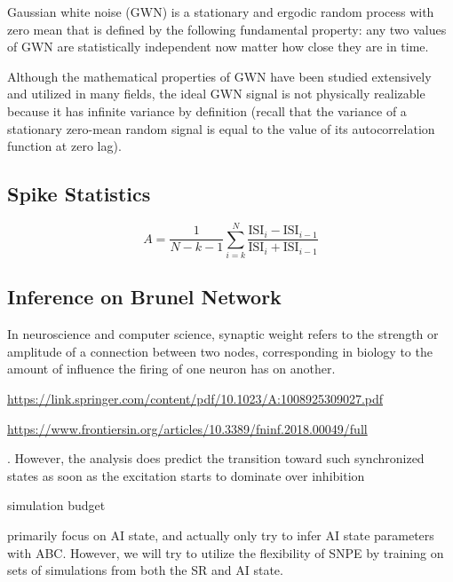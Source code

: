Gaussian white noise (GWN) is a stationary and ergodic random process with zero mean that is defined by the following fundamental property: any two values of GWN are statistically independent now matter how close they are in time. 

Although the mathematical properties of GWN have been studied extensively and utilized in many fields, the ideal GWN signal is not physically realizable because it has infinite variance by definition (recall that the variance of a stationary zero-mean random signal is equal to the value of its autocorrelation function at zero lag).

\subsection{Spike Statistics}\label{sec:spike_statistics}


\begin{equation}\label{eq:accomm_index}
    A = \frac{1}{N -k - 1} \sum_{i=k}^N \frac{\mathrm{ISI}_i - \mathrm{ISI}_{i-1}}{\mathrm{ISI}_i + \mathrm{ISI}_{i-1}}
\end{equation}


\subsection{Inference on Brunel Network}

In neuroscience and computer science, synaptic weight refers to the strength or amplitude of a connection between two nodes, corresponding in biology to the amount of influence the firing of one neuron has on another.

\url{https://link.springer.com/content/pdf/10.1023/A:1008925309027.pdf}

\url{https://www.frontiersin.org/articles/10.3389/fninf.2018.00049/full}

. However, the analysis does predict the transition
toward such synchronized states as soon as the excitation starts to dominate over inhibition

simulation budget

primarily focus on AI state, and actually only try to infer AI state parameters with ABC. However, we will try to utilize the flexibility of SNPE by training on sets of simulations from both the SR and AI state.

